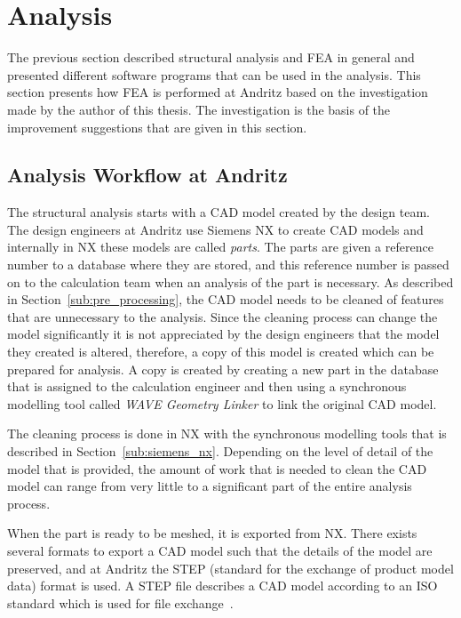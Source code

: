 
\chapter{Analysis} %
\label{cha:analysis}
The previous section described structural analysis and FEA in general and presented different software programs that can be used in the analysis. This section presents how FEA is performed at Andritz based on the investigation made by the author of this thesis. The investigation is the basis of the improvement suggestions that are given in this section.

\section{Analysis Workflow at Andritz} %
\label{sec:analysis_workflow_at_andritz}
The structural analysis starts with a CAD model created by the design team. The design engineers at Andritz use Siemens NX to create CAD models and internally in NX these models are called \textit{parts}. The parts are given a reference number to a database where they are stored, and this reference number is passed on to the calculation team when an analysis of the part is necessary. As described in Section~\ref{sub:pre_processing}, the CAD model needs to be cleaned of features that are unnecessary to the analysis. Since the cleaning process can change the model significantly it is not appreciated by the design engineers that the model they created is altered, therefore, a copy of this model is created which can be prepared for analysis. A copy is created by creating a new part in the database that is assigned to the calculation engineer and then using a synchronous modelling tool called \textit{WAVE Geometry Linker} to link the original CAD model.

The cleaning process is done in NX with the synchronous modelling tools that is described in Section~\ref{sub:siemens_nx}. Depending on the level of detail of the model that is provided, the amount of work that is needed to clean the CAD model can range from very little to a significant part of the entire analysis process. 

When the part is ready to be meshed, it is exported from NX. There exists several formats to export a CAD model such that the details of the model are preserved, and at Andritz the STEP (standard for the exchange of product model data) format is used. A STEP file describes a CAD model according to an ISO standard which is used for file exchange~\cite{stepiso}.

